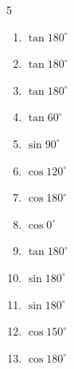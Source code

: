 \begin{multicols}{5}
\begin{enumerate}

\columnbreak %

  \item $\displaystyle \tan{180^\circ}$

        \phantom{$\displaystyle =0$}

  \item $\displaystyle \tan{180^\circ}$

        \phantom{$\displaystyle =0$}

  \item $\displaystyle \tan{180^\circ}$

        \phantom{$\displaystyle =0$}

  \item $\displaystyle \tan{60^\circ}$


  \item $\displaystyle \sin{90^\circ}$

        \phantom{$\displaystyle =1$}

  \item $\displaystyle \cos{120^\circ}$


  \item $\displaystyle \cos{180^\circ}$

        \phantom{$\displaystyle =-1$}

  \item $\displaystyle \cos{0^\circ}$

        \phantom{$\displaystyle =1$}

  \item $\displaystyle \tan{180^\circ}$

        \phantom{$\displaystyle =0$}

  \item $\displaystyle \sin{180^\circ}$

        \phantom{$\displaystyle =0$}

  \item $\displaystyle \sin{180^\circ}$

        \phantom{$\displaystyle =0$}

  \item $\displaystyle \cos{150^\circ}$


  \item $\displaystyle \cos{180^\circ}$


\end{enumerate}
\end{multicols}
